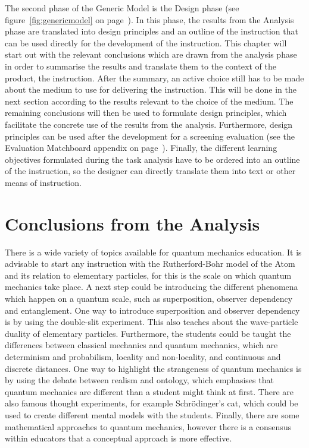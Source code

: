 \documentclass[11pt,twoside]{report} %
\begin{document}
The second phase of the Generic Model is the Design phase \cite{genericmodel} (see figure~\ref{fig:genericmodel} on page~\pageref{fig:genericmodel}). In this phase, the results from the Analysis phase are translated into design principles and an outline of the instruction that can be used directly for the development of the instruction. This chapter will start out with the relevant conclusions which are drawn from the analysis phase in order to summarise the results and translate them to the context of the product, the instruction. After the summary, an active choice still has to be made about the medium to use for delivering the instruction. This will be done in the next section according to the results relevant to the choice of the medium. The remaining conclusions will then be used to formulate design principles, which facilitate the concrete use of the results from the analysis. Furthermore, design principles can be used after the development for a screening evaluation \cite{evamatchboard} (see the Evaluation Matchboard appendix on page~\pageref{app:evamatchboard}). Finally, the different learning objectives formulated during the task analysis have to be ordered into an outline of the instruction, so the designer can directly translate them into text or other means of instruction.

\section{Conclusions from the Analysis}

There is a wide variety of topics available for quantum mechanics education. It is advisable to start any instruction with the Rutherford-Bohr model of the Atom and its relation to elementary particles, for this is the scale on which quantum mechanics take place. A next step could be introducing the different phenomena which happen on a quantum scale, such as superposition, observer dependency and entanglement. One way to introduce superposition and observer dependency is by using the double-slit experiment. This also teaches about the wave-particle duality of elementary particles. Furthermore, the students could be taught the differences between classical mechanics and quantum mechanics, which are determinism and probabilism, locality and non-locality, and continuous and discrete distances. One way to highlight the strangeness of quantum mechanics is by using the debate between realism and ontology, which emphasises that quantum mechanics are different than a student might think at first. There are also famous thought experiments, for example Schrödinger's cat, which could be used to create different mental models with the students. Finally, there are some mathematical approaches to quantum mechanics, however there is a consensus within educators that a conceptual approach is more effective.
\end{document}
